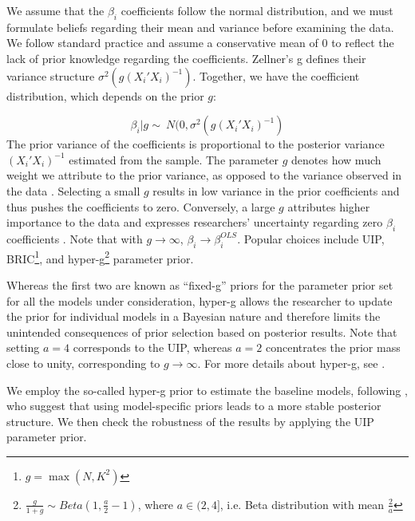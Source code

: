 \begin{refsection}
We assume that the $\beta_{i}$ coefficients follow the normal distribution, and we must formulate beliefs regarding their mean and variance before examining the data. We follow standard practice and assume a conservative mean of 0 to reflect the lack of prior knowledge regarding the coefficients. Zellner's g defines their variance structure $\sigma^{2}(g(X_{i}'X_{i})^{-1})$. Together, we have the coefficient distribution, which depends on the prior $g$:

\begin{equation}
\beta_{i}\vert g \sim\ N(0, \sigma^{2}(g(X_{i}'X_{i})^{-1}) 
\end{equation}
The prior variance of the coefficients is proportional to the posterior variance $(X_{i}'X_{i})^{-1}$ estimated from the sample. The parameter $g$ denotes how much weight we attribute to the prior variance, as opposed to the variance observed in the data \parencite{FeldkircherZeugner2009}. Selecting a small $g$ results in low variance in the prior coefficients and thus pushes the coefficients to zero. Conversely, a large $g$ attributes higher importance to the data and expresses researchers' uncertainty regarding zero $\beta_{i}$ coefficients \parencite{Zeugner2011}. Note that with $g \rightarrow \infty$, $\beta_{i} \rightarrow \beta^{OLS}_{i}$. Popular choices include \ac{UIP}, \ac{BRIC}\footnote{$g = \max({N, K^{2}})$}, and hyper-g\footnote{$\frac{g}{1+g} \sim Beta (1, \frac{a}{2} - 1)$, where $a \in (2,4]$, i.e. Beta distribution with mean $\frac{2}{a}$} parameter prior.

Whereas the first two are known as ``fixed-g'' priors for the parameter prior set for all the models under consideration, hyper-g allows the researcher to update the prior for individual models in a Bayesian nature and therefore limits the unintended consequences of prior selection based on posterior results. Note that setting $a=4$ corresponds to the \ac{UIP}, whereas $a=2$ concentrates the prior mass close to unity, corresponding to $g \rightarrow \infty$. For more details about hyper-g, see \textcite{Liangetal2008}.

We employ the so-called hyper-g prior to estimate the baseline models, following \textcite{FeldkircherZeugner2009}, who suggest that using model-specific priors leads to a more stable posterior structure. We then check the robustness of the results by applying the \ac{UIP} parameter prior.


\end{refsection}
